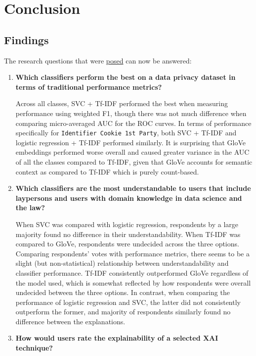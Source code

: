 \chapter{Conclusion} %
\label{chapter5} %

\section{Findings}
The research questions that were \hyperref[chap1:research_questions]{posed} can now be answered:
\begin{enumerate}
    \item \textbf{Which classifiers perform the best on a data privacy dataset in terms of traditional performance metrics?}
    
    Across all classes, SVC + Tf-IDF performed the best when measuring performance using weighted F1, though there was not much difference when comparing micro-averaged AUC for the ROC curves. In terms of performance specifically for \texttt{Identifier Cookie 1st Party}, both SVC + Tf-IDF and logistic regression + Tf-IDF performed similarly. It is surprising that GloVe embeddings performed worse overall and caused greater variance in the AUC of all the classes compared to Tf-IDF, given that GloVe accounts for semantic context as compared to Tf-IDF which is purely count-based.

    \item \textbf{Which classifiers are the most understandable to users that include laypersons and users with domain knowledge in data science and the law?}
    
    When SVC was compared with logistic regression, respondents by a large majority found no difference in their understandability. When Tf-IDF was compared to GloVe, respondents were undecided across the three options. Comparing respondents' votes with performance metrics, there seems to be a slight (but non-statistical) relationship between understandability and classifier performance. Tf-IDF consistently outperformed GloVe regardless of the model used, which is somewhat reflected by how respondents were overall undecided between the three options. In contrast, when comparing the performance of logistic regression and SVC, the latter did not consistently outperform the former, and majority of respondents similarly found no difference between the explanations.

    \item \textbf{How would users rate the explainability of a selected XAI technique?}
    

\end{enumerate}
